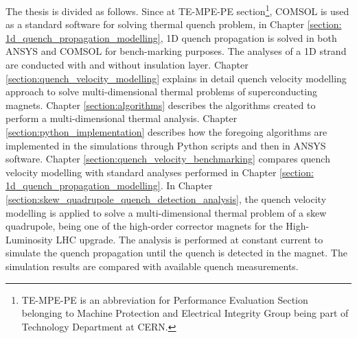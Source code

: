 
The thesis is divided as follows. Since at TE-MPE-PE section\footnote{TE-MPE-PE is an abbreviation for Performance Evaluation Section belonging to Machine Protection and Electrical Integrity Group being part of Technology Department at CERN.}, COMSOL is used as a standard software for solving thermal quench problem, in Chapter \ref{section: 1d_quench_propagation_modelling}, 1D quench propagation is solved in both ANSYS and COMSOL for bench-marking purposes. The analyses of a 1D strand are conducted with and without insulation layer. Chapter \ref{section:quench_velocity_modelling} explains in detail quench velocity modelling approach to solve multi-dimensional thermal problems of superconducting magnets.
Chapter \ref{section:algorithms} describes the algorithms created to perform a multi-dimensional thermal analysis. Chapter \ref{section:python_implementation} describes how the foregoing algorithms are implemented in the simulations through Python scripts and then in ANSYS software. Chapter \ref{section:quench_velocity_benchmarking} compares quench velocity modelling with standard analyses performed in Chapter \ref{section: 1d_quench_propagation_modelling}. In Chapter \ref{section:skew_quadrupole_quench_detection_analysis}, the quench velocity modelling is applied to solve a multi-dimensional thermal problem of a skew quadrupole, being one of the high-order corrector magnets for the High-Luminosity LHC upgrade. The analysis is performed at constant current to simulate the quench propagation until the quench is detected in the magnet. The simulation results are compared with available quench measurements.

